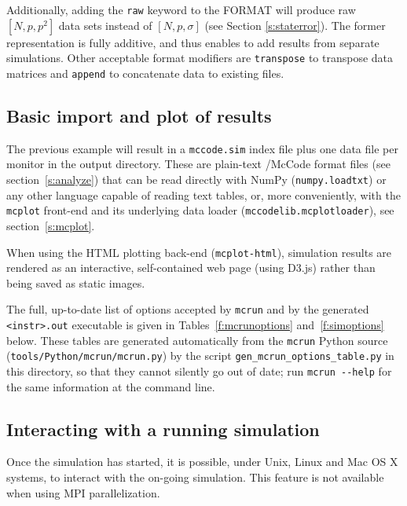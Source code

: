 Additionally, adding the \texttt{raw} keyword to the FORMAT will produce raw
$[N, p, p^2]$ data sets instead of $[N, p, \sigma]$ (see Section
\ref{s:staterror}). The former representation is fully additive, and thus
enables to add results from separate simulations. Other acceptable format
modifiers are \verb+transpose+ to transpose data matrices and \verb+append+ to
concatenate data to existing files.

\subsection{Basic import and plot of results}
\label{s:run-format}
The previous example will result in a \verb+mccode.sim+ index file plus one
data file per monitor in the output directory. These are plain-text
\MCS/McCode format files (see section~\ref{s:analyze}) that can be read
directly with NumPy (\texttt{numpy.loadtxt}) or any other language capable
of reading text tables, or, more conveniently, with the \verb+mcplot+
front-end and its underlying data loader
(\texttt{mccodelib.mcplotloader}), see section~\ref{s:mcplot}.

When using the HTML plotting back-end (\texttt{mcplot-html}), simulation
results are rendered as an interactive, self-contained web page (using D3.js)
rather than being saved as static images.

The full, up-to-date list of options accepted by \texttt{mcrun} and by the
generated \texttt{<instr>.out} executable is given in
Tables~\ref{f:mcrunoptions} and~\ref{f:simoptions} below. These tables are
generated automatically from the \texttt{mcrun} Python source
(\texttt{tools/Python/mcrun/mcrun.py}) by the script
\texttt{gen\_mcrun\_options\_table.py} in this directory, so that they cannot
silently go out of date; run \verb+mcrun --help+ for the same information
at the command line.



\subsection{Interacting with a running simulation}

Once the simulation has started, it is possible, under Unix, Linux and Mac OS X systems, to interact with the on-going simulation. This feature is not available when using MPI parallelization.

